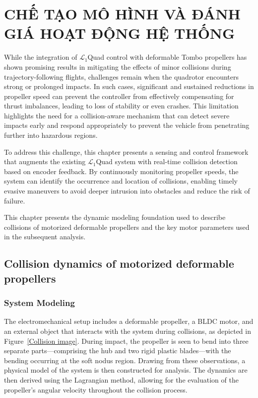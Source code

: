 \chapter[CHẾ TẠO MÔ HÌNH VÀ ĐÁNH GIÁ HỆ THỐNG]{CHẾ TẠO MÔ HÌNH VÀ ĐÁNH GIÁ HOẠT ĐỘNG HỆ THỐNG} \label{chap:tombo-encoder}

While the integration of $\mathcal{L}_1$Quad control with deformable Tombo propellers has shown promising results in mitigating the effects of minor collisions during trajectory-following flights, challenges remain when the quadrotor encounters strong or prolonged impacts. In such cases, significant and sustained reductions in propeller speed can prevent the controller from effectively compensating for thrust imbalances, leading to loss of stability or even crashes. This limitation highlights the need for a collision-aware mechanism that can detect severe impacts early and respond appropriately to prevent the vehicle from penetrating further into hazardous regions.

To address this challenge, this chapter presents a sensing and control framework that augments the existing $\mathcal{L}_1$Quad system with real-time collision detection based on encoder feedback. By continuously monitoring propeller speeds, the system can identify the occurrence and location of collisions, enabling timely evasive maneuvers to avoid deeper intrusion into obstacles and reduce the risk of failure.

This chapter presents the dynamic modeling foundation used to describe collisions of motorized deformable propellers and the key motor parameters used in the subsequent analysis.

\section{Collision dynamics of motorized deformable propellers} \label{sec: collision modeling}
\subsection{System Modeling}
The electromechanical setup includes a deformable propeller, a \gls{BLDC} motor, and an external object that interacts with the system during collisions, as depicted in Figure~\ref{Collision image}. During impact, the propeller is seen to bend into three separate parts—comprising the hub and two rigid plastic blades—with the bending occurring at the soft nodus region. Drawing from these observations, a physical model of the system is then constructed for analysis. The dynamics are then derived using the Lagrangian method, allowing for the evaluation of the propeller’s angular velocity throughout the collision process.

